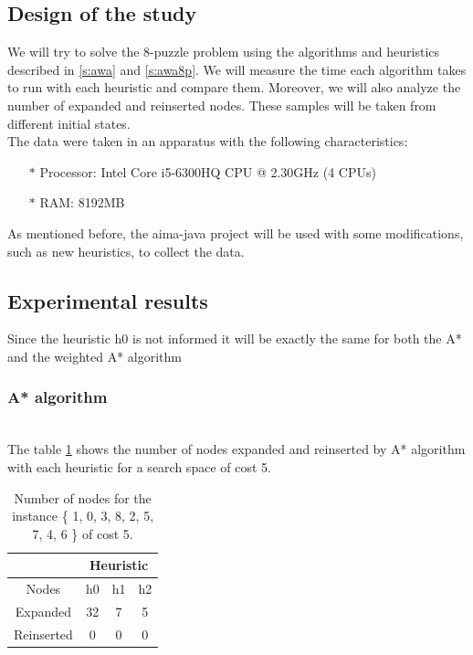 \documentclass[runningheads]{llncs}
\begin{document}
\subsection{Design of the study}
We will try to solve the 8-puzzle problem using the algorithms and heuristics described in \ref{s:awa} and \ref{s:awa8p}. We will measure the time each algorithm takes to run with each heuristic and compare them. Moreover, we will also analyze the number of expanded and reinserted nodes. These samples will be taken from different initial states.
\\
The data were taken in an apparatus with the following characteristics:

\begin{itemize}
\item[$\ast$] Processor: Intel Core i5-6300HQ CPU @ 2.30GHz (4 CPUs)
\item[$\ast$] RAM: 8192MB
\end{itemize}
As mentioned before, the aima-java project will be used with some modifications, such as new heuristics, to collect the data.
\subsection{Experimental results}
Since the heuristic h0 is not informed it will be exactly the same for both the A* and the weighted A* algorithm
\subsubsection{A* algorithm}~\\

The table \ref{tab:table1} shows the number of nodes expanded and reinserted by A* algorithm with each heuristic for a search space of cost 5.
\begin{table}
    \centering
\caption{\label{tab:table1}Number of nodes for the instance \{ 1, 0, 3, 8, 2, 5, 7, 4, 6 \} of cost 5.}
    \begin{tabular}{|c|c|c|c|}
    \hline
       & \multicolumn{3}{|c|}{Heuristic} \\ \hline
        Nodes & h0 & h1 & h2 \\ \hline
        Expanded & 32 & 7 & 5 \\ \hline
        Reinserted & 0 & 0 & 0 \\ \hline
    \end{tabular}
\end{table}
\end{document}
